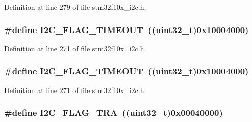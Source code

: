 Definition at line 279 of file stm32f10x\+\_\+i2c.\+h.

\subsubsection[{\texorpdfstring{I2\+C\+\_\+\+F\+L\+A\+G\+\_\+\+T\+I\+M\+E\+O\+UT}{I2C_FLAG_TIMEOUT}}]{\setlength{\rightskip}{0pt plus 5cm}\#define I2\+C\+\_\+\+F\+L\+A\+G\+\_\+\+T\+I\+M\+E\+O\+UT~(({\bf uint32\+\_\+t})0x10004000)}\hypertarget{group___i2_c__flags__definition_ga89c8d5d8ccc77a8619fafe9b39d1cc74}{}\label{group___i2_c__flags__definition_ga89c8d5d8ccc77a8619fafe9b39d1cc74}


Definition at line 271 of file stm32f10x\+\_\+i2c.\+h.

\subsubsection[{\texorpdfstring{I2\+C\+\_\+\+F\+L\+A\+G\+\_\+\+T\+I\+M\+E\+O\+UT}{I2C_FLAG_TIMEOUT}}]{\setlength{\rightskip}{0pt plus 5cm}\#define I2\+C\+\_\+\+F\+L\+A\+G\+\_\+\+T\+I\+M\+E\+O\+UT~(({\bf uint32\+\_\+t})0x10004000)}\hypertarget{group___i2_c__flags__definition_ga89c8d5d8ccc77a8619fafe9b39d1cc74}{}\label{group___i2_c__flags__definition_ga89c8d5d8ccc77a8619fafe9b39d1cc74}


Definition at line 271 of file stm32f10x\+\_\+i2c.\+h.

\subsubsection[{\texorpdfstring{I2\+C\+\_\+\+F\+L\+A\+G\+\_\+\+T\+RA}{I2C_FLAG_TRA}}]{\setlength{\rightskip}{0pt plus 5cm}\#define I2\+C\+\_\+\+F\+L\+A\+G\+\_\+\+T\+RA~(({\bf uint32\+\_\+t})0x00040000)}\hypertarget{group___i2_c__flags__definition_ga0359a5f960670d51cb17e659d32498ea}{}\label{group___i2_c__flags__definition_ga0359a5f960670d51cb17e659d32498ea}


